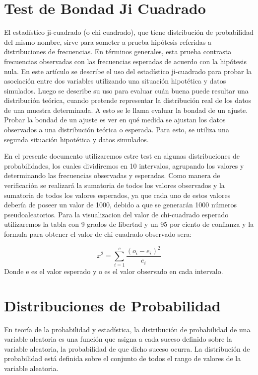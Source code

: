 \documentclass{article}
\begin{document}
  \section{Test de Bondad Ji Cuadrado}
  El estadístico ji-cuadrado (o chi cuadrado), que tiene distribución de probabilidad del mismo nombre, sirve para someter a prueba hipótesis referidas a distribuciones de frecuencias. En términos generales, esta prueba contrasta frecuencias observadas con las frecuencias esperadas de acuerdo con la hipótesis nula. En este artículo se describe el uso del estadístico ji-cuadrado para probar la asociación entre dos variables utilizando una situación hipotética y datos simulados. Luego se describe su uso para evaluar cuán buena puede resultar una distribución teórica, cuando pretende representar la distribución real de los datos de una muestra determinada. A esto se le llama evaluar la bondad de un ajuste. Probar la bondad de un ajuste es ver en qué medida se ajustan los datos observados a una distribución teórica o esperada. Para esto, se utiliza una segunda situación hipotética y datos simulados.

  En el presente documento utilizaremos estre test en algunas distribuciones de probabilidades, los cuales dividiremos en 10 intervalos, agrupando los valores y determinando las frecuencias observadas y esperadas.
  Como manera de verificación se realizará la sumatoria de todos los valores observados y la sumatoria de todos los valores esperados, ya que cada uno de estos valores debería de poseer un valor de 1000, debido a que se generarán 1000 números pseudoaleatorios.
  Para la visualizacion del valor de chi-cuadrado esperado utilizaremos la tabla con 9 grados de libertad y un 95 por ciento de confianza y la
  formula para obtener el valor de chi-cuadrado observado sera:

  \begin{equation}
    x^2 = \sum_{i = 1}^{c}\frac{(o_{i}-e_{i})^2}{e_{i}}
    \end{equation}
  Donde e es el valor esperado y o es el valor observado en cada intervalo.

  \section{Distribuciones de Probabilidad}

    En teoría de la probabilidad y estadística, la distribución de probabilidad de una variable
    aleatoria es una función que asigna a cada suceso definido sobre la variable aleatoria, la
    probabilidad de que dicho suceso ocurra. La distribución de probabilidad está definida
    sobre el conjunto de todos el rango de valores de la variable aleatoria.
\end{document}
